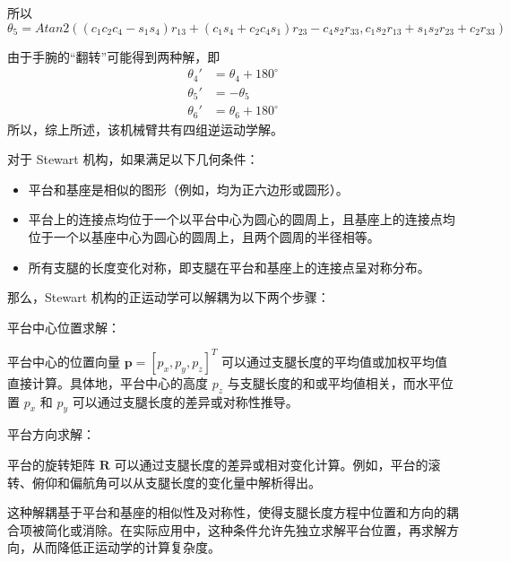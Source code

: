 \documentclass{homework}
\begin{document}
\begin{sol}
所以
\[
  \theta_5 = Atan2((c_1 c_2 c_4 - s_1 s_4) r_{13} + (c_1 s_4 + c_2 c_4 s_1) r_{23} - c_4 s_2 r_{33}, c_1 s_2 r_{13} + s_1 s_2 r_{23} + c_2 r_{33})
\]

由于手腕的“翻转”可能得到两种解，即
\begin{align*}
  \theta_4' &= \theta_4 + 180^\circ \\
  \theta_5' &= -\theta_5 \\
  \theta_6' &= \theta_6 + 180^\circ
\end{align*}
所以，综上所述，该机械臂共有四组逆运动学解。

\end{sol}

\question

\begin{sol}

对于 Stewart 机构，如果满足以下几何条件：

\begin{itemize}
  \item 平台和基座是相似的图形（例如，均为正六边形或圆形）。
  \item 平台上的连接点均位于一个以平台中心为圆心的圆周上，且基座上的连接点均位于一个以基座中心为圆心的圆周上，且两个圆周的半径相等。
  \item 所有支腿的长度变化对称，即支腿在平台和基座上的连接点呈对称分布。
\end{itemize}

那么，Stewart 机构的正运动学可以解耦为以下两个步骤：

平台中心位置求解：

平台中心的位置向量 $ \mathbf{p} = [p_x, p_y, p_z]^T $ 可以通过支腿长度的平均值或加权平均值直接计算。具体地，平台中心的高度 $ p_z $ 与支腿长度的和或平均値相关，而水平位置 $ p_x $ 和 $ p_y $ 可以通过支腿长度的差异或对称性推导。

平台方向求解：

平台的旋转矩阵 $ \mathbf{R} $ 可以通过支腿长度的差异或相对变化计算。例如，平台的滚转、俯仰和偏航角可以从支腿长度的变化量中解析得出。

这种解耦基于平台和基座的相似性及对称性，使得支腿长度方程中位置和方向的耦合项被简化或消除。在实际应用中，这种条件允许先独立求解平台位置，再求解方向，从而降低正运动学的计算复杂度。

\end{sol}

\question
\end{document}
